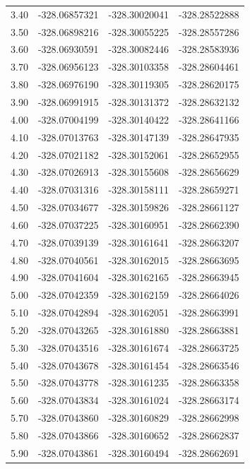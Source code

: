 {{\begin{longtable}{p{} p{} p{} p{}}
    3.40  & -328.06857321 & -328.30020041 & -328.28522888 \\
    3.50  & -328.06898216 & -328.30055225 & -328.28557286 \\
    3.60  & -328.06930591 & -328.30082446 & -328.28583936 \\
    3.70  & -328.06956123 & -328.30103358 & -328.28604461 \\
    3.80  & -328.06976190 & -328.30119305 & -328.28620175 \\
    3.90  & -328.06991915 & -328.30131372 & -328.28632132 \\
    4.00  & -328.07004199 & -328.30140422 & -328.28641166 \\
    4.10  & -328.07013763 & -328.30147139 & -328.28647935 \\
    4.20  & -328.07021182 & -328.30152061 & -328.28652955 \\
    4.30  & -328.07026913 & -328.30155608 & -328.28656629 \\
    4.40  & -328.07031316 & -328.30158111 & -328.28659271 \\
    4.50  & -328.07034677 & -328.30159826 & -328.28661127 \\
    4.60  & -328.07037225 & -328.30160951 & -328.28662390 \\
    4.70  & -328.07039139 & -328.30161641 & -328.28663207 \\
    4.80  & -328.07040561 & -328.30162015 & -328.28663695 \\
    4.90  & -328.07041604 & -328.30162165 & -328.28663945 \\
    5.00  & -328.07042359 & -328.30162159 & -328.28664026 \\
    5.10  & -328.07042894 & -328.30162051 & -328.28663991 \\
    5.20  & -328.07043265 & -328.30161880 & -328.28663881 \\
    5.30  & -328.07043516 & -328.30161674 & -328.28663725 \\
    5.40  & -328.07043678 & -328.30161454 & -328.28663546 \\
    5.50  & -328.07043778 & -328.30161235 & -328.28663358 \\
    5.60  & -328.07043834 & -328.30161024 & -328.28663174 \\
    5.70  & -328.07043860 & -328.30160829 & -328.28662998 \\
    5.80  & -328.07043866 & -328.30160652 & -328.28662837 \\
    5.90  & -328.07043861 & -328.30160494 & -328.28662691 \\

\end{longtable}}}
